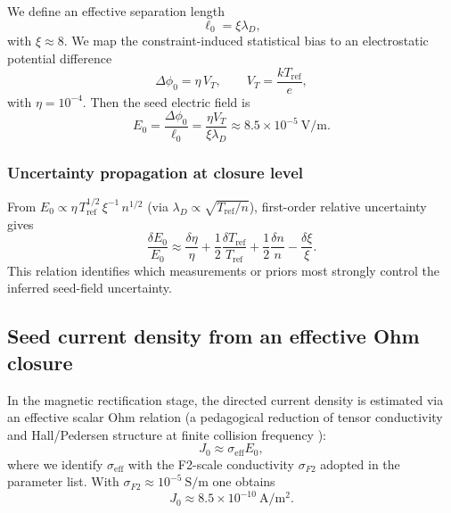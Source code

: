 \documentclass[11pt,a4paper]{article}
\begin{document}
We define an effective separation length
\begin{equation}
\ell_0=\xi \lambda_D,
\end{equation}
with $\xi\approx 8$.
We map the constraint-induced statistical bias to an electrostatic potential difference
\begin{equation}
\Delta\phi_0=\eta\,V_T,\qquad V_T=\frac{kT_{\mathrm{ref}}}{e},
\end{equation}
with $\eta=10^{-4}$.
Then the seed electric field is
\begin{equation}
E_0=\frac{\Delta\phi_0}{\ell_0}=\frac{\eta V_T}{\xi\lambda_D}\approx 8.5\times10^{-5}~\mathrm{V/m}.
\end{equation}

\subsubsection{Uncertainty propagation at closure level}
From $E_0\propto \eta\,T_{\mathrm{ref}}^{1/2}\,\xi^{-1}\,n^{1/2}$ (via $\lambda_D\propto\sqrt{T_{\mathrm{ref}}/n}$), first-order relative uncertainty gives
\begin{equation}
\frac{\delta E_0}{E_0}\approx
\frac{\delta\eta}{\eta}
+\frac{1}{2}\frac{\delta T_{\mathrm{ref}}}{T_{\mathrm{ref}}}
+\frac{1}{2}\frac{\delta n}{n}
-\frac{\delta\xi}{\xi}.
\end{equation}
This relation identifies which measurements or priors most strongly control the inferred seed-field uncertainty.

\subsection{Seed current density from an effective Ohm closure}
In the magnetic rectification stage, the directed current density is estimated via an effective scalar Ohm relation (a pedagogical reduction of tensor conductivity and Hall/Pedersen structure at finite collision frequency \cite{Kelley2009EarthIonosphere,SchunkNagy2009IonospherePhysics}):
\begin{equation}
J_0\approx \sigma_{\mathrm{eff}}E_0,
\end{equation}
where we identify $\sigma_{\mathrm{eff}}$ with the F2-scale conductivity $\sigma_{F2}$ adopted in the parameter list. With $\sigma_{F2}\approx 10^{-5}~\mathrm{S/m}$ one obtains
\begin{equation}
J_0\approx 8.5\times10^{-10}~\mathrm{A/m^2}.
\end{equation}
\end{document}
